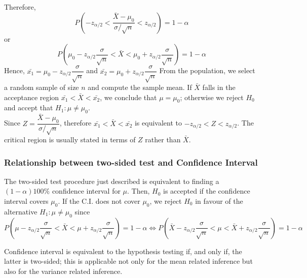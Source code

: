 Therefore,
$$
P\left( -z_{\alpha/2} < \dfrac{\bar{X} - \mu_0}{\sigma/\sqrt{n}} < z_{\alpha/2}
\right) = 1 - \alpha
$$
or
$$
P\left( \mu_0 -z_{\alpha/2}\dfrac{\sigma}{\sqrt{n}} < \bar{X} < \mu_0 + z_{\alpha/2}\dfrac{\sigma}{\sqrt{n}}
\right) = 1 - \alpha
$$
Hence, $\bar{x_1} =\mu_0 -z_{\alpha/2}\dfrac{\sigma}{\sqrt{n}} $ and $\bar{x_2} = \mu_0 + z_{\alpha/2}\dfrac{\sigma}{\sqrt{n}}$
From the population, we select a random sample of size $n$ and compute the sample mean. If $\bar{X}$ falls in the acceptance region $\bar{x_1} < \bar{X} < \bar{x_2}$, we conclude that $\mu = \mu_0$; otherwise we reject $H_0$ and accept that $H_1: \mu \neq \mu_0$. \\
Since $Z = \dfrac{\bar{X} - \mu_0}{\sigma/\sqrt{n}}$, therefore  $\bar{x_1} < \bar{X} < \bar{x_2}$ is equivalent to $-z_{\alpha/2} < Z < z_{\alpha/2}$. The critical region is usually stated in terms of $Z$ rather than $\bar{X}$.
\subsubsection{Relationship between two-sided test and Confidence Interval}
The two-sided test procedure just described is equivalent to finding a $(1 - \alpha)100\%$ confidence interval for $\mu$. Then, $H_0$ is accepted if the confidence interval covers $\mu_0$. If the C.I. does not cover $\mu_0$, we reject $H_0$ in favour of the alternative $H_1: \mu \neq \mu_0$ since
$$
P\left( \mu -z_{\alpha/2}\dfrac{\sigma}{\sqrt{n}} < \bar{X} < \mu + z_{\alpha/2}\dfrac{\sigma}{\sqrt{n}}
\right) = 1 - \alpha \iff P\left( \bar{X} -z_{\alpha/2}\dfrac{\sigma}{\sqrt{n}} < \mu < \bar{X} + z_{\alpha/2}\dfrac{\sigma}{\sqrt{n}}
\right) = 1 - \alpha 
$$
\begin{note}
\end{note}
{\color{blue}Confidence interval is equivalent to the hypothesis testing if, and only if, the latter is two-sided; this is applicable not only for the mean related inference but also for the variance related inference.}
